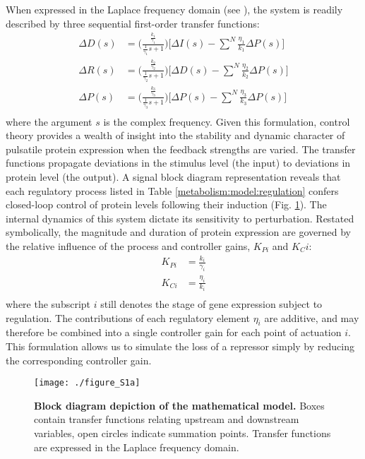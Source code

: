 When expressed in the Laplace frequency domain (see \cite{Seborg2011}), the system is readily described by three sequential first-order transfer functions:
\begin{equation}
\begin{aligned}
\Delta D(s) &= \Big( \frac{\frac{k_1}{\gamma_1}}{\frac{1}{\gamma_1}s+1} \Big) \Big [\Delta I(s) - \sum\limits_{}^{N} \frac{\eta_{1}}{k_1}\Delta P(s) \Big ] \\
\Delta R(s) &= \Big( \frac{\frac{k_2}{\gamma_2}}{\frac{1}{\gamma_2}s+1} \Big) \Big [\Delta D(s) - \sum\limits_{}^{N} \frac{\eta_{2}}{k_2}\Delta P(s) \Big ] \\
\Delta P(s) &= \Big( \frac{\frac{k_3}{\gamma_3}}{\frac{1}{\gamma_3}s+1} \Big) \Big [\Delta P(s) - \sum\limits_{}^{N} \frac{\eta_{3}}{k_3}\Delta P(s) \Big ] \\
\end{aligned}
\end{equation}
where the argument $s$ is the complex frequency. Given this formulation, control theory provides a wealth of insight into the stability and dynamic character of pulsatile protein expression when the feedback strengths are varied. The transfer functions propagate deviations in the stimulus level (the input) to deviations in protein level (the output). A signal block diagram representation reveals that each regulatory process listed in Table \ref{metabolism:model:regulation} confers closed-loop control of protein levels following their induction (Fig. \ref{fig:metabolism:figS1a}). The internal dynamics of this system dictate its sensitivity to perturbation. Restated symbolically, the magnitude and duration of protein expression are governed by the relative influence of the process and controller gains, $K_{Pi}$  and $K_Ci$:
\begin{equation}
\begin{aligned}
K_{Pi} &= \frac{k_i}{\gamma_i} \\
K_{Ci} &= \frac{\eta_i}{k_i} \\
\end{aligned}
\end{equation}
where the subscript $i$ still denotes the stage of gene expression subject to regulation. The contributions of each regulatory element $\eta_i$ are additive, and may therefore be combined into a single controller gain for each point of actuation $i$. This formulation allows us to simulate the loss of a repressor simply by reducing the corresponding controller gain.

\begin{figure}[h!]
\centering
\texttt{[image: ./figure\_S1a]}
\captionsetup{width=.65\linewidth}
\caption[Block diagram depiction of the mathematical model.]{\textbf{Block diagram depiction of the mathematical model.} Boxes contain transfer functions relating upstream and downstream variables, open circles indicate summation points. Transfer functions are expressed in the Laplace frequency domain.}
\label{fig:metabolism:figS1a}
\end{figure}

